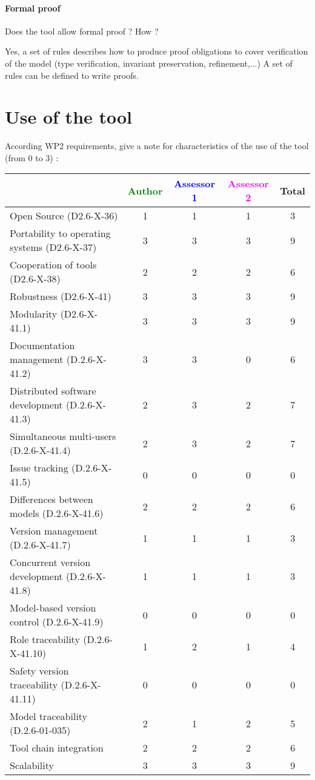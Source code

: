 \paragraph{Formal proof}
Does the tool allow formal proof ?  How ?

\begin{author_comment}
Yes, a set of rules describes how to  produce proof obligations to cover verification of the model (type verification, invariant preservation, refinement,...)
A set of rules can be defined to  write proofs.  
\end{author_comment}

\section{Use of the tool}


According WP2 requirements, give a note for characteristics of the use of the tool (from 0 to 3) :

\begin{tabular}{|l | c | c | c | c|}
\hline
& \textcolor{green}{Author} & \textcolor{blue}{Assessor 1} & \textcolor{magenta}{Assessor 2} & Total \\
\hline 
Open Source (D2.6-X-36) & 1 & 1 & 1 & 3 \\
\hline 
Portability to operating systems (D2.6-X-37) & 3 & 3 & 3 & 9 \\
\hline
Cooperation of tools (D2.6-X-38) & 2 & 2 & 2 & 6 \\
\hline
Robustness (D2.6-X-41) & 3 & 3 & 3 & 9 \\
\hline
Modularity (D2.6-X-41.1) & 3 & 3 & 3 & 9 \\
\hline
Documentation management (D.2.6-X-41.2) & 3 & 3 & 0 & 6 \\
\hline
Distributed software development (D.2.6-X-41.3)  & 2 & 3 & 2 & 7 \\
\hline
Simultaneous multi-users (D.2.6-X-41.4)   & 2 & 3 & 2 & 7 \\
\hline
Issue tracking (D.2.6-X-41.5) & 0 & 0 & 0 & 0 \\
\hline
Differences between models (D.2.6-X-41.6) & 2 & 2 & 2 & 6 \\
\hline
Version management (D.2.6-X-41.7) & 1 & 1 & 1 & 3 \\
\hline
Concurrent version development (D.2.6-X-41.8) & 1 & 1 & 1 & 3 \\
\hline
Model-based version control (D.2.6-X-41.9) & 0 & 0 & 0 & 0 \\
\hline
Role traceability (D.2.6-X-41.10) & 1 & 2 & 1 & 4 \\
\hline
Safety version traceability (D.2.6-X-41.11) & 0 & 0 & 0 & 0 \\
\hline
Model traceability (D.2.6-01-035) & 2 & 1 & 2 & 5 \\
\hline
Tool chain integration & 2 & 2 & 2 & 6 \\
\hline
Scalability & 3 & 3 & 3& 9 \\
\hline
\end{tabular}

